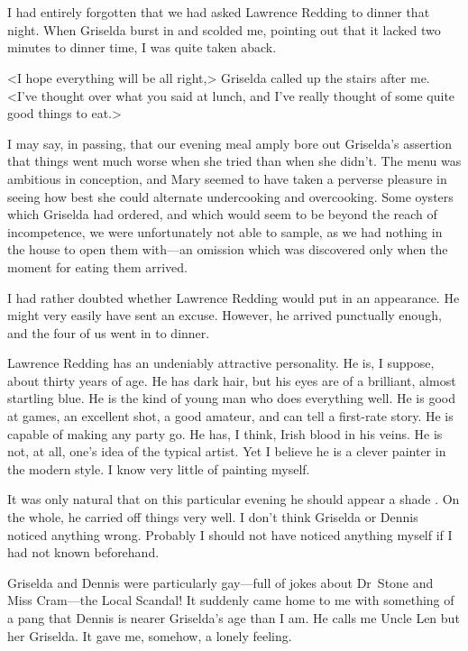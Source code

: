 \chapter[Chapter  \thechapter]{}


\lettrine{I}{} had entirely forgotten that we had asked Lawrence Redding to dinner that night. When Griselda burst in and scolded me, pointing out that it lacked two minutes to dinner time, I was quite taken aback.

<I hope everything will be all right,> Griselda called up the stairs after me. <I've thought over what you said at lunch, and I've really thought of some quite good things to eat.>

I may say, in passing, that our evening meal amply bore out Griselda's assertion that things went much worse when she tried than when she didn't. The menu was ambitious in conception, and Mary seemed to have taken a perverse pleasure in seeing how best she could alternate undercooking and overcooking. Some oysters which Griselda had ordered, and which would seem to be beyond the reach of incompetence, we were unfortunately not able to sample, as we had nothing in the house to open them with—an omission which was discovered only when the moment for eating them arrived.

I had rather doubted whether Lawrence Redding would put in an appearance. He might very easily have sent an excuse. However, he arrived punctually enough, and the four of us went in to dinner.

Lawrence Redding has an undeniably attractive personality. He is, I suppose, about thirty years of age. He has dark hair, but his eyes are of a brilliant, almost startling blue. He is the kind of young man who does everything well. He is good at games, an excellent shot, a good amateur, and can tell a first-rate story. He is capable of making any party go. He has, I think, Irish blood in his veins. He is not, at all, one's idea of the typical artist. Yet I believe he is a clever painter in the modern style. I know very little of painting myself.

It was only natural that on this particular evening he should appear a shade . On the whole, he carried off things very well. I don't think Griselda or Dennis noticed anything wrong. Probably I should not have noticed anything myself if I had not known beforehand.

Griselda and Dennis were particularly gay—full of jokes about Dr~Stone and Miss Cram—the Local Scandal! It suddenly came home to me with something of a pang that Dennis is nearer Griselda's age than I am. He calls me Uncle Len but her Griselda. It gave me, somehow, a lonely feeling.

